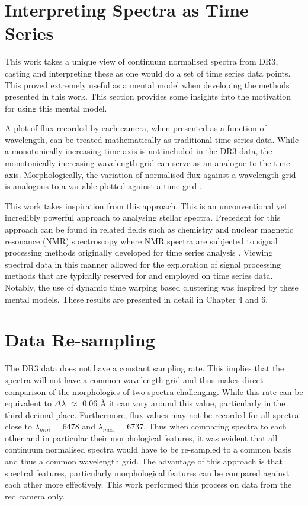 \section{Interpreting Spectra as Time Series}

This work takes a unique view of continuum normalised spectra from DR3, casting and interpreting these as one would do a set of time series data points. This proved extremely useful as a mental model when developing the methods presented in this work. This section provides some insights into the motivation for using this mental model. 

A plot of flux recorded by each camera, when presented as a function of wavelength, can be treated mathematically as traditional time series data. While a monotonically increasing time axis is not included in the DR3 data, the monotonically increasing wavelength grid can serve as an analogue to the time axis. Morphologically, the variation of normalised flux against a wavelength grid is analogous to a variable plotted against a time grid \citep{nielsen2019practical}.

This work takes inspiration from this approach. This is an unconventional yet incredibly powerful approach to analysing stellar spectra. Precedent for this approach can be found in related fields such as chemistry and nuclear magnetic resonance (NMR) spectroscopy where NMR spectra are subjected to signal processing methods originally developed for time series analysis \citep{nielsen2019practical}. Viewing spectral data in this manner allowed for the exploration of signal processing methods that are typically reserved for and employed on time series data. Notably, the use of dynamic time warping based clustering was inspired by these mental models. These results are presented in detail in Chapter 4 and 6.

\section{Data Re-sampling}

The DR3 data does not have a constant sampling rate. This implies that the spectra will not have a common wavelength grid and thus makes direct comparison of the morphologies of two spectra challenging. While this rate can be equivalent to $\Delta\lambda$ $\approx$ 0.06 \r{A} \citep{vcotar2021galah} it can vary around this value, particularly in the third decimal place. Furthermore, flux values may not be recorded for all spectra close to $\lambda_{min}$ = 6478 and $\lambda_{max}$ = 6737. Thus when comparing spectra to each other and in particular their morphological features, it was evident that all continuum normalised spectra would have to be re-sampled to a common basis and thus a common wavelength grid. The advantage of this approach is that spectral features, particularly morphological features can be compared against each other more effectively. This work performed this process on data from the red camera only. 

